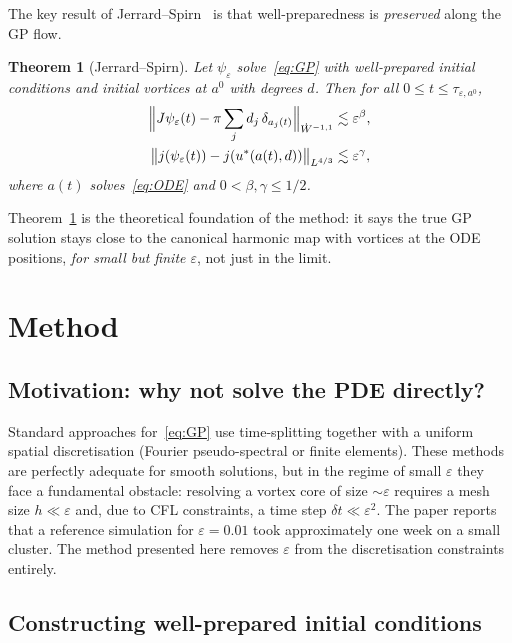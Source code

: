 \documentclass[12pt, a4paper]{article}
\theoremstyle{plain}
\newtheorem{theorem}{Theorem}[section]
\theoremstyle{definition}
\newcommand{\psieps}{\psi_\varepsilon}
\begin{document}
The key result of Jerrard--Spirn~\cite{JerrardSpirnRefined2008} is that
well-preparedness is \emph{preserved} along the GP flow.

\begin{theorem}[Jerrard--Spirn]
  \label{thm:JS}
  Let $\psieps$ solve~\eqref{eq:GP} with well-prepared initial conditions
  and initial vortices at $a^0$ with degrees $d$.
  Then for all $0 \le t \le \tau_{\varepsilon,a^0}$,
  \begin{align}
    \Bigl\| J\psieps(t) - \pi\sum_j d_j\,\delta_{a_j(t)}
    \Bigr\|_{\dot W^{-1,1}} &\lesssim \varepsilon^\beta,
    \label{eq:JS-Jac}\\
    \bigl\| j(\psieps(t)) - j(u^*(a(t),d)) \bigr\|_{L^{4/3}} &\lesssim \varepsilon^\gamma,
    \label{eq:JS-j}
  \end{align}
  where $a(t)$ solves~\eqref{eq:ODE} and $0 < \beta, \gamma \le 1/2$.
\end{theorem}

Theorem~\ref{thm:JS} is the theoretical foundation of the method:
it says the true GP solution stays close to the canonical harmonic map
with vortices at the ODE positions, \emph{for small but finite $\varepsilon$},
not just in the limit.

\section{Method}

\subsection{Motivation: why not solve the PDE directly?}

Standard approaches for~\eqref{eq:GP} use time-splitting together
with a uniform spatial discretisation (Fourier pseudo-spectral or finite elements).
These methods are perfectly adequate for smooth solutions,
but in the regime of small $\varepsilon$ they face a fundamental obstacle:
resolving a vortex core of size $\sim\varepsilon$ requires a mesh size $h \ll \varepsilon$
and, due to CFL constraints, a time step $\delta t \ll \varepsilon^2$.
The paper reports that a reference simulation for $\varepsilon = 0.01$
took approximately one week on a small cluster.
The method presented here removes $\varepsilon$ from the discretisation
constraints entirely.

\subsection{Constructing well-prepared initial conditions}
\end{document}
